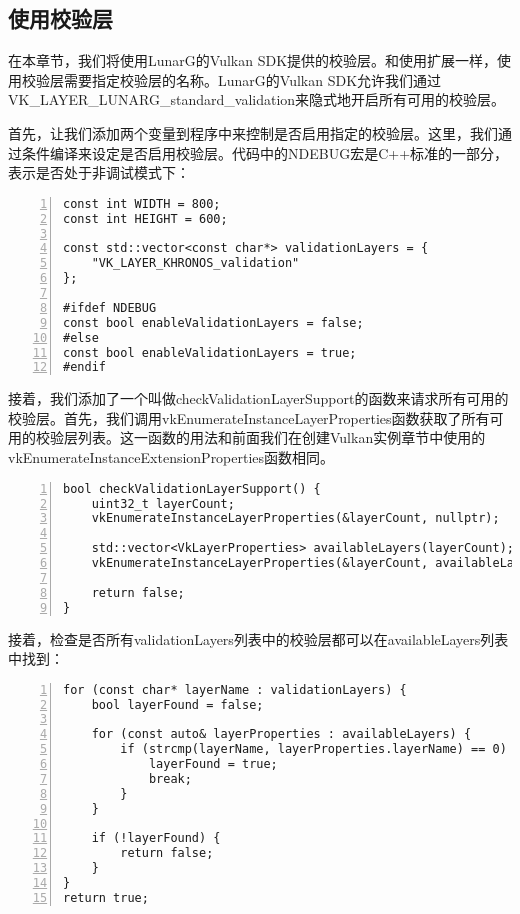 \documentclass{ctexart}
\begin{document}
\subsection{使用校验层}

在本章节，我们将使用LunarG的Vulkan SDK提供的校验层。和使用扩展一样，使用校验层需要指定校验层的名称。LunarG的Vulkan SDK允许我们通过VK\_LAYER\_LUNARG\_standard\_validation来隐式地开启所有可用的校验层。

首先，让我们添加两个变量到程序中来控制是否启用指定的校验层。这里，我们通过条件编译来设定是否启用校验层。代码中的NDEBUG宏是C++标准的一部分，表示是否处于非调试模式下：

\begin{lstlisting}[language={[ANSI]C},keywordstyle=\color{blue!70},commentstyle=\color{red!50!green!50!blue!50},frame=shadowbox, rulesepcolor=\color{red!20!green!20!blue!20},basicstyle=\small,numbers=left, numberstyle=\tiny,breaklines=true]
const int WIDTH = 800;
const int HEIGHT = 600;

const std::vector<const char*> validationLayers = {
	"VK_LAYER_KHRONOS_validation"
};

#ifdef NDEBUG
const bool enableValidationLayers = false;
#else
const bool enableValidationLayers = true;
#endif
\end{lstlisting}

接着，我们添加了一个叫做checkValidationLayerSupport的函数来请求所有可用的校验层。首先，我们调用vkEnumerateInstanceLayerProperties函数获取了所有可用的校验层列表。这一函数的用法和前面我们在创建Vulkan实例章节中使用的vkEnumerateInstanceExtensionProperties函数相同。

\begin{lstlisting}[language={[ANSI]C},keywordstyle=\color{blue!70},commentstyle=\color{red!50!green!50!blue!50},frame=shadowbox, rulesepcolor=\color{red!20!green!20!blue!20},basicstyle=\small,numbers=left, numberstyle=\tiny,breaklines=true]
bool checkValidationLayerSupport() {
	uint32_t layerCount;
	vkEnumerateInstanceLayerProperties(&layerCount, nullptr);

	std::vector<VkLayerProperties> availableLayers(layerCount);
	vkEnumerateInstanceLayerProperties(&layerCount, availableLayers.data());

	return false;
}
\end{lstlisting}

接着，检查是否所有validationLayers列表中的校验层都可以在availableLayers列表中找到：

\begin{lstlisting}[language={[ANSI]C},keywordstyle=\color{blue!70},commentstyle=\color{red!50!green!50!blue!50},frame=shadowbox, rulesepcolor=\color{red!20!green!20!blue!20},basicstyle=\small,numbers=left, numberstyle=\tiny,breaklines=true]
for (const char* layerName : validationLayers) {
	bool layerFound = false;

	for (const auto& layerProperties : availableLayers) {
		if (strcmp(layerName, layerProperties.layerName) == 0) {
			layerFound = true;
			break;
		}
	}

	if (!layerFound) {
		return false;
	}
}
return true;
\end{lstlisting}
\end{document}
